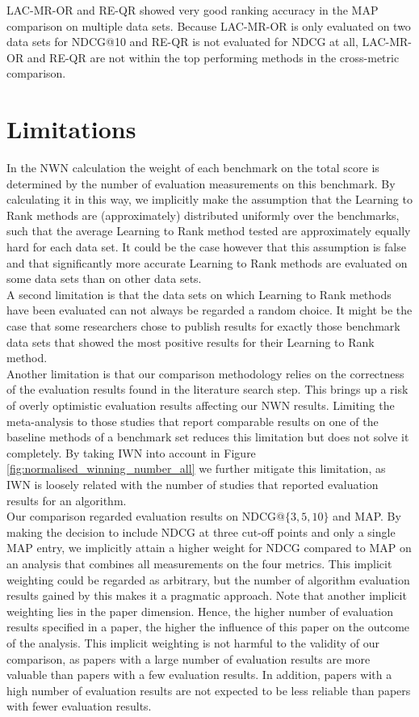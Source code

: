 LAC-MR-OR and RE-QR showed very good ranking accuracy in the \ac{MAP} comparison on multiple data sets. Because LAC-MR-OR is only evaluated on two data sets for \ac{NDCG}@10 and RE-QR is not evaluated for \ac{NDCG} at all, LAC-MR-OR and RE-QR are not within the top performing methods in the cross-metric comparison. 

\section{Limitations}
In the \ac{NWN} calculation the weight of each benchmark on the total score is determined by the number of evaluation measurements on this benchmark. By calculating it in this way, we implicitly make the assumption that the Learning to Rank methods are (approximately) distributed uniformly over the benchmarks, such that the average Learning to Rank method tested are approximately equally hard for each data set. It could be the case however that this assumption is false and that significantly more accurate Learning to Rank methods are evaluated on some data sets than on other data sets. \\

A second limitation is that the data sets on which Learning to Rank methods have been evaluated can not always be regarded a random choice. It might be the case that some researchers chose to publish results for exactly those benchmark data sets that showed the most positive results for their Learning to Rank method.\\

Another limitation is that our comparison methodology relies on the correctness of the evaluation results found in the literature search step. This brings up a risk of overly optimistic evaluation results affecting our \ac{NWN} results. Limiting the meta-analysis to those studies that report comparable results on one of the baseline methods of a benchmark set reduces this limitation but does not solve it completely. By taking \ac{IWN} into account in Figure \ref{fig:normalised_winning_number_all} we further mitigate this limitation, as \ac{IWN} is loosely related with the number of studies that reported evaluation results for an algorithm.\\

Our comparison regarded evaluation results on \ac{NDCG}@$\{3,5,10\}$ and \ac{MAP}. By making the decision to include \ac{NDCG} at three cut-off points and only a single \ac{MAP} entry, we implicitly attain a higher weight for \ac{NDCG} compared to \ac{MAP} on an analysis that combines all measurements on the four metrics. This implicit weighting could be regarded as arbitrary, but the number of algorithm evaluation results gained by this makes it a pragmatic approach. Note that another implicit weighting lies in the paper dimension. Hence, the higher number of evaluation results specified in a paper, the higher the influence of this paper on the outcome of the analysis. This implicit weighting is not harmful to the validity of our comparison, as papers with a large number of evaluation results are more valuable than papers with a few evaluation results. In addition, papers with a high number of evaluation results are not expected to be less reliable than papers with fewer evaluation results.

